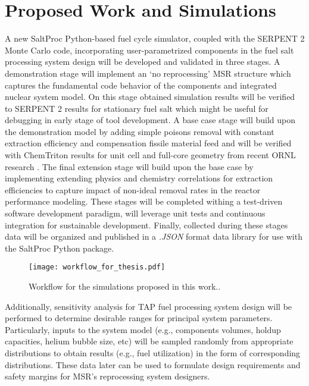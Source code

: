 \section{Proposed Work and Simulations}
A new SaltProc Python-based fuel cycle simulator, coupled with
the SERPENT 2 Monte Carlo code, incorporating user-parametrized 
components in the fuel salt processing system design will be 
developed and validated in three stages. A demonstration stage will implement 
an ‘no reprocessing’ \gls{MSR} structure which captures the 
fundamental code behavior of the components and integrated nuclear 
system model. On this stage obtained simulation results will be 
verified to SERPENT 2 results for stationary fuel salt which 
might be useful for debugging in early stage of tool development.
A base case stage will build upon the demonstration model by 
adding simple poisons removal with constant extraction efficiency 
and compensation fissile material feed and will be 
verified with ChemTriton results for unit cell and full-core 
geometry from recent \gls{ORNL} research 
\cite{betzler_two-dimensional_2016, betzler_assessment_2017}.
The final extension stage will build upon the base case by 
implementing extending physics and chemistry correlations for 
extraction efficiencies to capture impact of non-ideal 
removal rates in the reactor performance modeling. These 
stages will be completed withing a test-driven software 
development paradigm, will leverage unit tests and 
continuous integration for sustainable development. Finally, 
collected during these stages data will be organized and 
published in a \textit{.JSON} format data library for use 
with the SaltProc Python package.
\begin{figure}[ht!] %
  \centering
  \texttt{[image: workflow\_for\_thesis.pdf]} 
  \caption{Workflow for the simulations proposed in this work..}
  \label{fig:workflow}
\end{figure}

Additionally, sensitivity analysis for \gls{TAP} fuel processing 
system design will be performed to determine desirable ranges 
for principal system parameters. Particularly, inputs to the 
system model (e.g., components volumes, holdup capacities, helium 
bubble size, etc) will be sampled randomly from appropriate 
distributions to obtain results (e.g., fuel utilization) in the 
form of corresponding distributions. These data later can be used 
to formulate design requirements and safety margins for 
\gls{MSR}'s reprocessing system designers.

